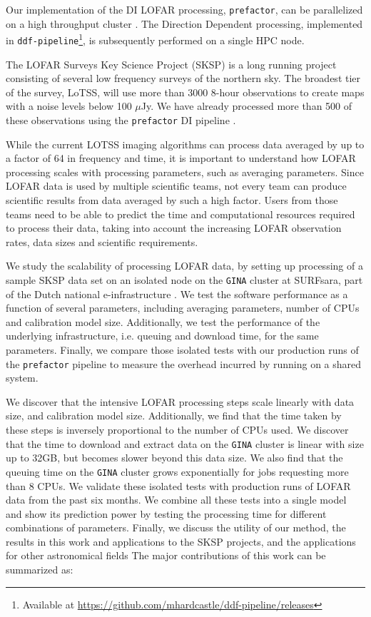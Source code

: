 \documentclass[preprint,5p]{elsarticle}
\begin{document}
Our implementation of the DI LOFAR processing, \texttt{prefactor}, can be parallelized on a high throughput cluster \citep{mechev17}. The Direction Dependent processing, implemented in \texttt{ddf-pipeline}\footnote{Available at \href{https://github.com/mhardcastle/ddf-pipeline/releases}{https://github.com/mhardcastle/ddf-pipeline/releases}}, is subsequently performed on a single HPC node. 

The LOFAR Surveys Key Science Project (SKSP) \citep{lotss, LOTSS_DR2} is a long running project consisting of several low frequency surveys of the northern sky. The broadest tier of the survey, LoTSS, will use more than 3000 8-hour observations to create maps with a noise levels below 100 $\mu$Jy. We have already processed more than 500 of these observations using the \texttt{prefactor} DI pipeline \citep{lofar_prefactor, prefactor_zenodo}. 

While the current LOTSS imaging algorithms can process data averaged by up to a factor of 64 in frequency and time, it is important to understand how LOFAR processing scales with processing parameters, such as averaging parameters. Since LOFAR data is used by multiple scientific teams, not every team can produce scientific results from data averaged by such a high factor. Users from those teams need to be able to predict the time and computational resources required to process their data, taking into account the increasing LOFAR observation rates, data sizes and scientific requirements. 

We study the scalability of processing LOFAR data, by setting up processing of a sample SKSP data set on an isolated node on the \texttt{GINA} cluster at SURFsara, part of the Dutch national e-infrastructure \citep{dutch_einfra}. We test the software performance as a function of several parameters, including averaging parameters, number of CPUs and calibration model size. Additionally, we test the performance of the underlying infrastructure, i.e. queuing  and download time, for the same parameters. Finally, we compare those isolated tests with our production runs of the \texttt{prefactor} pipeline to measure the overhead incurred by running on a shared system. 

We discover that the intensive LOFAR processing steps scale linearly with data size, and calibration model size. Additionally, we find that the time taken by these steps is inversely proportional to the number of CPUs used. We discover that the time to download and extract data on the \texttt{GINA} cluster is linear with size up to 32GB, but becomes slower beyond this data size. We also find that the queuing time on the \texttt{GINA} cluster grows exponentially for jobs requesting more than 8 CPUs. We validate these isolated tests with production runs of LOFAR data from the past six months. We combine all these tests into a single model and show its prediction power by testing the processing time for different combinations of parameters. Finally, we discuss the utility of our method, the results in this work and applications to the SKSP projects, and the applications for other astronomical fields The major contributions of this work can be summarized as:
\end{document}

